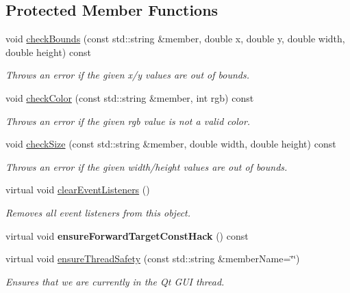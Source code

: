 \subsection*{Protected Member Functions}
\begin{DoxyCompactItemize}
\item 
void \mbox{\hyperlink{classGDrawingSurface_a3a690bcb2d62250c9e4722ad7c1b9ab6}{check\+Bounds}} (const std\+::string \&member, double x, double y, double width, double height) const
\begin{DoxyCompactList}\small\item\em Throws an error if the given x/y values are out of bounds. \end{DoxyCompactList}\item 
void \mbox{\hyperlink{classGDrawingSurface_a9841b5dc607ca41a14819d80e1d8a09c}{check\+Color}} (const std\+::string \&member, int rgb) const
\begin{DoxyCompactList}\small\item\em Throws an error if the given rgb value is not a valid color. \end{DoxyCompactList}\item 
void \mbox{\hyperlink{classGDrawingSurface_a70a6546707ae708573396616bd0f5320}{check\+Size}} (const std\+::string \&member, double width, double height) const
\begin{DoxyCompactList}\small\item\em Throws an error if the given width/height values are out of bounds. \end{DoxyCompactList}\item 
virtual void \mbox{\hyperlink{classGObservable_a80cfa040459ff53594adbd6a51ec8f43}{clear\+Event\+Listeners}} ()
\begin{DoxyCompactList}\small\item\em Removes all event listeners from this object. \end{DoxyCompactList}\item 
virtual void {\bfseries ensure\+Forward\+Target\+Const\+Hack} () const
\item 
virtual void \mbox{\hyperlink{classGObservable_a284f31528c0520f8e545c03ac9eeac74}{ensure\+Thread\+Safety}} (const std\+::string \&member\+Name=\char`\"{}\char`\"{})
\begin{DoxyCompactList}\small\item\em Ensures that we are currently in the Qt G\+UI thread. \end{DoxyCompactList}\item 

\end{DoxyCompactItemize}
